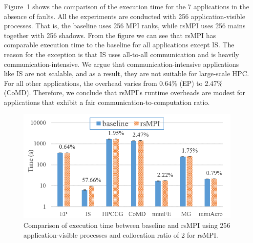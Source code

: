Figure~\ref{fig:runtime_overhead} shows the comparison of the execution time for the 7 applications in the absence of faults. All the experiments are conducted with 256 application-visible processes. That is, the baseline uses 256 MPI ranks, while rsMPI uses 256 mains together with 256 shadows. %
From the figure we can see that rsMPI has comparable execution time to the baseline for all applications except IS. The reason for the exception is that IS uses all-to-all communication and is heavily communication-intensive. %
We argue that communication-intensive applications like IS are not scalable, and as a result, they are not suitable for large-scale HPC. 
For all other applications, the overhead varies from 0.64\% (EP) to 2.47\% (CoMD). %
Therefore, we conclude that rsMPI's runtime overheads are modest for applications that exhibit a fair communication-to-computation ratio.

\begin{figure}[!t]
  \begin{center}
      \includegraphics[width=0.9\columnwidth]{Figures/runtime_overhead_hpcc}
  \end{center}
  \vskip -0.1in
  \caption{Comparison of execution time between baseline and rsMPI using 256 application-visible processes and collocation ratio of 2 for rsMPI.}
  \label{fig:runtime_overhead}
\end{figure}

